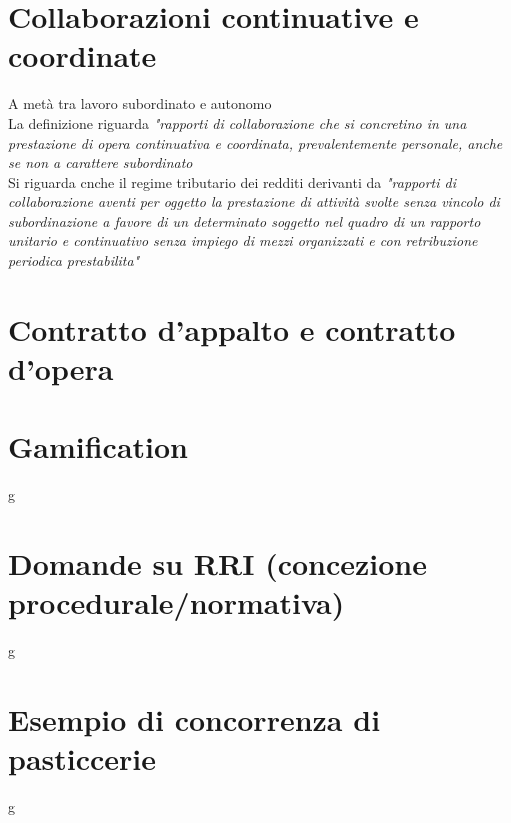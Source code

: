 \documentclass[8pt,oneside,a4paper]{article}
\begin{document}
	\section{Collaborazioni continuative e coordinate}
	A metà tra lavoro subordinato e autonomo\\
	La definizione riguarda \textit{"rapporti di collaborazione che si concretino in una prestazione di opera continuativa e coordinata, prevalentemente personale, anche se non a carattere subordinato}\\
	Si riguarda cnche il regime tributario dei redditi derivanti da \textit{"rapporti di collaborazione aventi per oggetto la prestazione di attività svolte senza vincolo di subordinazione a favore di un determinato soggetto nel quadro di un rapporto unitario e continuativo senza impiego di mezzi organizzati e con retribuzione periodica prestabilita"}\\
	\section{Contratto d'appalto e contratto d'opera}
	
	\section{Gamification}
	g
	\section{Domande su RRI (concezione procedurale/normativa)}
	g
	\section{Esempio di concorrenza di pasticcerie}
	g
\end{document}
